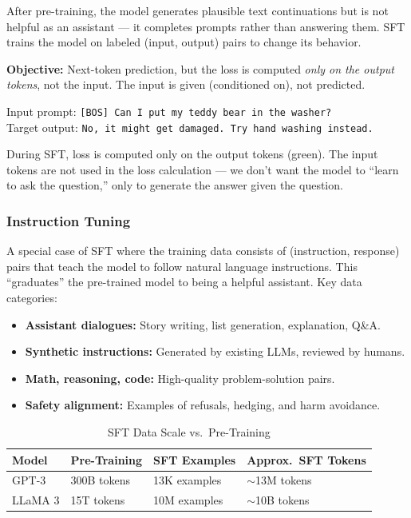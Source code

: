 \documentclass[11pt, a4paper]{article}
\begin{document}
\begin{defbox}
After pre-training, the model generates plausible text continuations but is not helpful as an assistant --- it completes prompts rather than answering them. SFT trains the model on labeled (input, output) pairs to change its behavior.

\textbf{Objective:} Next-token prediction, but the loss is computed \emph{only on the output tokens}, not the input. The input is given (conditioned on), not predicted.
\end{defbox}

\begin{exbox}
Input prompt: \texttt{[BOS] Can I put my teddy bear in the washer?}\\
Target output: \texttt{No, it might get damaged. Try hand washing instead.}

During SFT, loss is computed only on the output tokens (green). The input tokens are not used in the loss calculation --- we don't want the model to ``learn to ask the question,'' only to generate the answer given the question.
\end{exbox}

\subsubsection{Instruction Tuning}

\begin{defbox}
A special case of SFT where the training data consists of (instruction, response) pairs that teach the model to follow natural language instructions. This ``graduates'' the pre-trained model to being a helpful assistant. Key data categories:
\begin{itemize}[leftmargin=1.5em]
  \item \textbf{Assistant dialogues:} Story writing, list generation, explanation, Q\&A.
  \item \textbf{Synthetic instructions:} Generated by existing LLMs, reviewed by humans.
  \item \textbf{Math, reasoning, code:} High-quality problem-solution pairs.
  \item \textbf{Safety alignment:} Examples of refusals, hedging, and harm avoidance.
\end{itemize}
\end{defbox}

\begin{table}[h]
\centering
\caption{SFT Data Scale vs.\ Pre-Training}
\begin{tabular}{@{}llll@{}}
\toprule
\textbf{Model} & \textbf{Pre-Training} & \textbf{SFT Examples} & \textbf{Approx.\ SFT Tokens} \\
\midrule
GPT-3 & 300B tokens & 13K examples & $\sim$13M tokens \\
LLaMA 3 & 15T tokens & 10M examples & $\sim$10B tokens \\
\bottomrule
\end{tabular}
\end{table}
\end{document}
